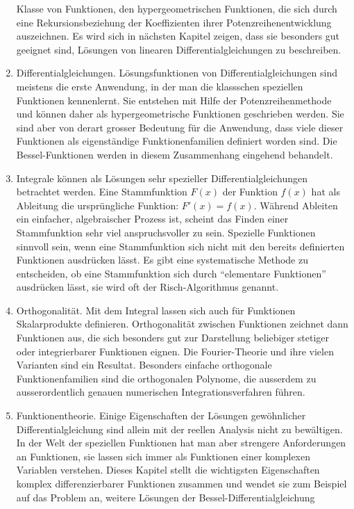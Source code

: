 \begin{enumerate}
Klasse von Funktionen, den hypergeometrischen Funktionen, die sich
durch eine Rekursionsbeziehung der Koeffizienten ihrer
Potenzreihenentwicklung auszeichnen.
Es wird sich in nächsten Kapitel zeigen, dass sie besonders gut
geeignet sind, Lösungen von linearen Differentialgleichungen zu
beschreiben.
\item
Differentialgleichungen.
Lösungsfunktionen von Differentialgleichungen sind meistens die
erste Anwendung, in der man die klassschen speziellen Funktionen
kennenlernt.
Sie entstehen mit Hilfe der Potenzreihenmethode und können daher
als hypergeometrische Funktionen geschrieben werden.
Sie sind aber von derart grosser Bedeutung für die Anwendung,
dass viele dieser Funktionen als eigenständige Funktionenfamilien
definiert worden sind.
Die Bessel-Funktionen werden in diesem Zusammenhang eingehend
behandelt.
\item
Integrale können als Lösungen sehr spezieller Differentialgleichungen
betrachtet werden.
Eine Stammfunktion $F(x)$ der Funktion $f(x)$ hat als Ableitung die
ursprüngliche Funktion: $F'(x)=f(x)$.
Während Ableiten ein einfacher, algebraischer Prozess ist, 
scheint das Finden einer Stammfunktion sehr viel anspruchsvoller
zu sein.
Spezielle Funktionen sinnvoll sein, wenn eine Stammfunktion sich nicht
mit den bereits definierten Funktionen ausdrücken lässt.
Es gibt eine systematische Methode zu entscheiden, ob eine Stammfunktion
sich durch ``elementare Funktionen'' ausdrücken lässt, sie wird oft
der Risch-Algorithmus genannt.
\item
Orthogonalität.
Mit dem Integral lassen sich auch für Funktionen Skalarprodukte
definieren.
Orthogonalität zwischen Funktionen zeichnet dann Funktionen aus, die
sich besonders gut zur Darstellung beliebiger stetiger oder
integrierbarer Funktionen eignen.
Die Fourier-Theorie und ihre vielen Varianten sind ein Resultat.
Besonders einfache orthogonale Funktionenfamilien sind die orthogonalen
Polynome, die ausserdem zu ausserordentlich genauen numerischen
Integrationsverfahren führen.
\item
Funktionentheorie.
Einige Eigenschaften der Lösungen gewöhnlicher Differentialgleichung
sind allein mit der reellen Analysis nicht zu bewältigen.
In der Welt der speziellen Funktionen hat man aber strengere
Anforderungen an Funktionen, sie lassen sich immer als Funktionen
einer komplexen Variablen verstehen.
Dieses Kapitel stellt die wichtigsten Eigenschaften komplex
differenzierbarer Funktionen zusammen und wendet sie zum Beispiel
auf das Problem an, weitere Lösungen der Bessel-Differentialgleichung

\end{enumerate}
